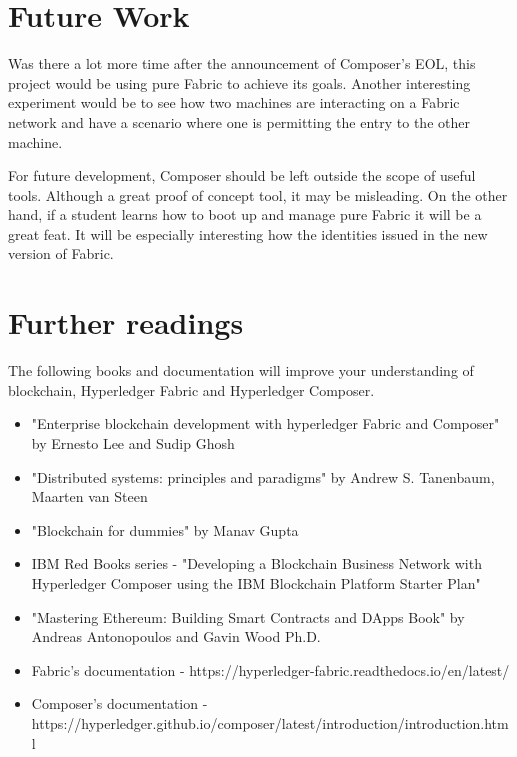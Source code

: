 \documentclass[a4paper,11pt]{report}
\begin{document}
\section{Future Work}

\label{conclusion-future}

Was there a lot more time after the announcement of Composer’s EOL, this project would be using pure Fabric to achieve its goals. Another interesting experiment would be to see how two machines are interacting on a Fabric network and have a scenario where one is permitting the entry to the other machine.  

For future development, Composer should be left outside the scope of useful tools. Although a great proof of concept tool, it may be misleading. On the other hand, if a student learns how to boot up and manage pure Fabric it will be a great feat. It will be especially interesting how the identities issued in the new version of Fabric. 

\section{Further readings}
The following books and documentation will improve your understanding of blockchain, Hyperledger Fabric and Hyperledger Composer.

\begin{itemize}
	\item "Enterprise blockchain development with hyperledger Fabric and Composer" by Ernesto Lee and Sudip Ghosh
	\item "Distributed systems: principles and paradigms" by Andrew S. Tanenbaum, Maarten van Steen
	\item "Blockchain for dummies" by Manav Gupta 
	\item IBM Red Books series - "Developing a Blockchain Business Network with Hyperledger Composer using the IBM Blockchain Platform Starter Plan" 
	\item "Mastering Ethereum: Building Smart Contracts and DApps Book" by Andreas Antonopoulos and Gavin Wood Ph.D.
	\item Fabric's documentation - https://hyperledger-fabric.readthedocs.io/en/latest/
	\item Composer's documentation - https://hyperledger.github.io/composer/latest/introduction/introduction.html
\end{itemize}




\end{document}
